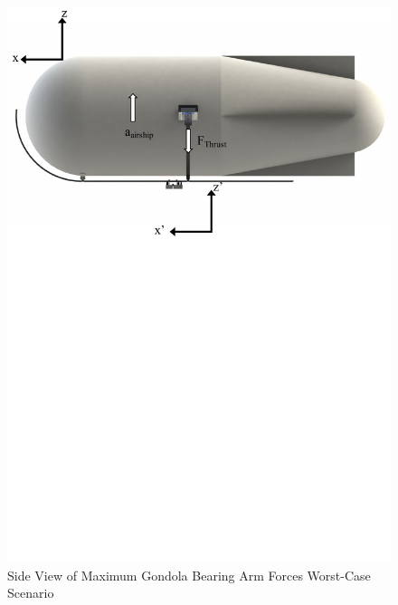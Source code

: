 \documentclass[../main.tex]{subfiles}
\begin{document}
\begin{figure}[H]
	\centering
	\includegraphics[width=1\textwidth]{img/analysis/scenario2.pdf}
	\caption{Side View of Maximum Gondola Bearing Arm Forces Worst-Case Scenario}
	\label{fig:scenario2}
\end{figure}
\end{document}
